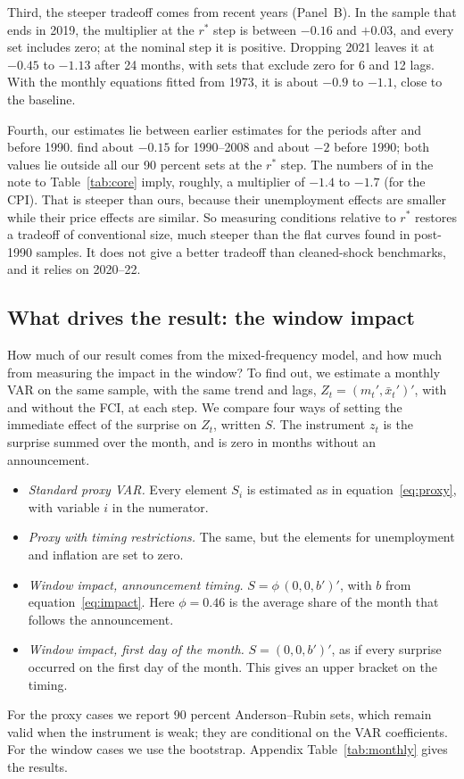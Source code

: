 \documentclass[11pt]{article}
\newcommand{\rs}{r^{*}}
\begin{document}
Third, the steeper tradeoff comes from recent years (Panel~B). In the sample that ends in 2019, the multiplier at the $\rs$ step is between $-0.16$ and $+0.03$, and every set includes zero; at the nominal step it is positive. Dropping 2021 leaves it at $-0.45$ to $-1.13$ after 24 months, with sets that exclude zero for 6 and 12 lags. With the monthly equations fitted from 1973, it is about $-0.9$ to $-1.1$, close to the baseline.

Fourth, our estimates lie between earlier estimates for the periods after and before 1990. \citet{barnichon2021} find about $-0.15$ for 1990--2008 and about $-2$ before 1990; both values lie outside all our 90 percent sets at the $\rs$ step. The numbers of \citet{bauer2023} in the note to Table~\ref{tab:core} imply, roughly, a multiplier of $-1.4$ to $-1.7$ (for the CPI). That is steeper than ours, because their unemployment effects are smaller while their price effects are similar. So measuring conditions relative to $\rs$ restores a tradeoff of conventional size, much steeper than the flat curves found in post-1990 samples. It does not give a better tradeoff than cleaned-shock benchmarks, and it relies on 2020--22.

\subsection{What drives the result: the window impact}\label{sec:drives}
How much of our result comes from the mixed-frequency model, and how much from measuring the impact in the window? To find out, we estimate a monthly VAR on the same sample, with the same trend and lags, $Z_t=(m_t',\bar x_t')'$, with and without the FCI, at each step. We compare four ways of setting the immediate effect of the surprise on $Z_t$, written $S$. The instrument $z_t$ is the surprise summed over the month, and is zero in months without an announcement.
\begin{itemize}
\item \emph{Standard proxy VAR.} Every element $S_i$ is estimated as in equation~\eqref{eq:proxy}, with variable $i$ in the numerator.
\item \emph{Proxy with timing restrictions.} The same, but the elements for unemployment and inflation are set to zero.
\item \emph{Window impact, announcement timing.} $S=\phi\,(0,0,b')'$, with $b$ from equation~\eqref{eq:impact}. Here $\phi=0.46$ is the average share of the month that follows the announcement.
\item \emph{Window impact, first day of the month.} $S=(0,0,b')'$, as if every surprise occurred on the first day of the month. This gives an upper bracket on the timing.
\end{itemize}
For the proxy cases we report 90 percent Anderson--Rubin sets, which remain valid when the instrument is weak; they are conditional on the VAR coefficients. For the window cases we use the bootstrap. Appendix Table~\ref{tab:monthly} gives the results.
\end{document}

